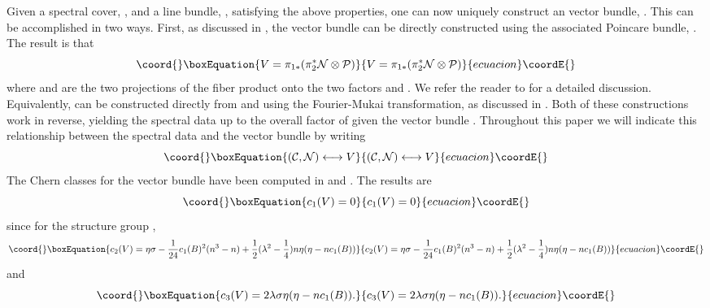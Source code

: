 \documentclass[a4paper,12pt]{article}
\numberwithin{equation}{section}
\def\cC{{\mathcal C}}
\def\cN{{\mathcal N}}
\theoremstyle{plain}
\begin{document}
Given a spectral cover, \myHighlight{$\cC$}\coordHE{}, and a line bundle, \myHighlight{$\cN$}\coordHE{}, satisfying the above
properties, one can now uniquely construct an \coordHE{} vector bundle, \coordHE{}. This
can be accomplished in two ways. First, as discussed in \cite{FMW, don2}, 
the vector bundle
can be directly constructed using the associated Poincare bundle,
\coordHE{}.
The result is that 
\begin{equation}\coord{}\boxEquation{
V=\pi_{1*}(\pi^{*}_{2}\cN\otimes {\mathcal P})
\label{eq:30}
}{
V=\pi_{1*}(\pi^{*}_{2}\cN\otimes {\mathcal P})
}{ecuacion}\coordE{}\end{equation}
where \coordHE{} and \coordHE{} are the two projections of the fiber
product \myHighlight{$X \times_{B} \cC$}\coordHE{} onto the two factors \coordHE{} and \myHighlight{$\cC$}\coordHE{}. We refer the
reader to \cite{FMW, don2} for a detailed discussion. Equivalently, \coordHE{} can be
constructed directly from \myHighlight{$\cC$}\coordHE{} and \myHighlight{$\cN$}\coordHE{} using the Fourier-Mukai
transformation, as discussed in \cite{don3, mathpaper, AD}. 
Both of these constructions work in
reverse, yielding the spectral data \myHighlight{$(\cC, \cN)$}\coordHE{} up to the overall factor
of \coordHE{} given the vector bundle \coordHE{}. 
Throughout this paper we will indicate this relationship between the
spectral data and the vector bundle by writing
\begin{equation}\coord{}\boxEquation{
(\cC,\cN) \longleftrightarrow V
\label{eq:31}
}{
(\cC,\cN) \longleftrightarrow V
}{ecuacion}\coordE{}\end{equation}
The Chern classes for the \coordHE{} vector bundle \coordHE{} have been 
computed in \cite{FMW}
and \cite{don3, curio}. The results are
\begin{equation}\coord{}\boxEquation{
c_{1}(V)=0
\label{eq:32}
}{
c_{1}(V)=0
}{ecuacion}\coordE{}\end{equation}
since \coordHE{} for the structure group \coordHE{},
\begin{equation}\coord{}\boxEquation{
c_2(V)=\eta\sigma-\frac{1}{24}c_1(B)^2(n^3-n)
+\frac{1}{2}(\lambda^2-\frac{1}{4})n\eta(\eta-nc_1(B)) 
\label{eq:33}
}{
c_2(V)=\eta\sigma-\frac{1}{24}c_1(B)^2(n^3-n)
+\frac{1}{2}(\lambda^2-\frac{1}{4})n\eta(\eta-nc_1(B)) 
}{ecuacion}\coordE{}\end{equation}
and
\begin{equation}\coord{}\boxEquation{
c_3(V)= 2\lambda \sigma \eta(\eta-nc_1(B)). 
\label{eq:34} 
}{
c_3(V)= 2\lambda \sigma \eta(\eta-nc_1(B)). 
}{ecuacion}\coordE{}\end{equation}
\end{document}
